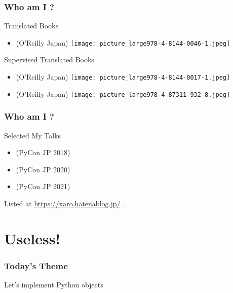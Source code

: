 \documentclass[aspectratio=169,dvipdfmx,12pt,notheorems]{beamer}
\theoremstyle{definition}
\begin{document}
\begin{frame}\frametitle{Who am I ?}

\begin{block}{Translated Books}
\begin{itemize}
\item {}(O'Reilly Japan)  \texttt{[image: picture\_large978-4-8144-0046-1.jpeg]}
\end{itemize}
\end{block}

\begin{block}{Supervised Translated Books}
\begin{itemize}
\item {}(O'Reilly Japan) \texttt{[image: picture\_large978-4-8144-0017-1.jpeg]}
\item {}(O'Reilly Japan) \texttt{[image: picture\_large978-4-87311-932-8.jpeg]}
\end{itemize}
\end{block}

\end{frame}

\begin{frame}\frametitle{Who am I ?}

\begin{block}{Selected My Talks}
\begin{itemize}
\item {}(PyCon JP 2018)
\item {}(PyCon JP 2020)
\item {}(PyCon JP 2021)
\end{itemize}
\end{block}
Listed at \url{https://xaro.hatenablog.jp/} .
\end{frame}

\section{Useless!}

\begin{frame}\frametitle{Today's Theme}

\begin{center}
\Huge{Let's implement  Python objects}
\end{center}

\end{frame}
\end{document}
